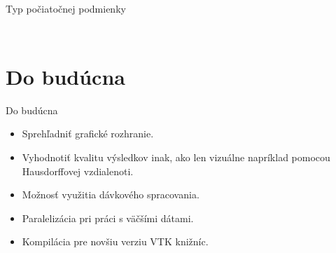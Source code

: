 \documentclass{beamer}
\begin{document}
\begin{frame}{Typ počiatočnej podmienky}
\begin{columns}
\begin{column}{0.5\textwidth}
\begin{figure}
        \qquad
	\end{figure}
\end{column}
\end{columns}
\end{frame}

\section*{Do budúcna}
\begin{frame}{Do budúcna}
\begin{itemize}
\item Sprehľadniť grafické rozhranie.
	\vspace{2mm}
\item Vyhodnotiť kvalitu výsledkov inak, ako len vizuálne napríklad pomocou Hausdorffovej vzdialenoti.
	\vspace{2mm}
\item Možnosť využitia dávkového spracovania.
	\vspace{2mm}
\item Paralelizácia pri práci s väčšími dátami.
	\vspace{2mm}
\item Kompilácia pre novšiu verziu VTK knižníc.
\end{itemize}
\end{frame}
\end{document}
